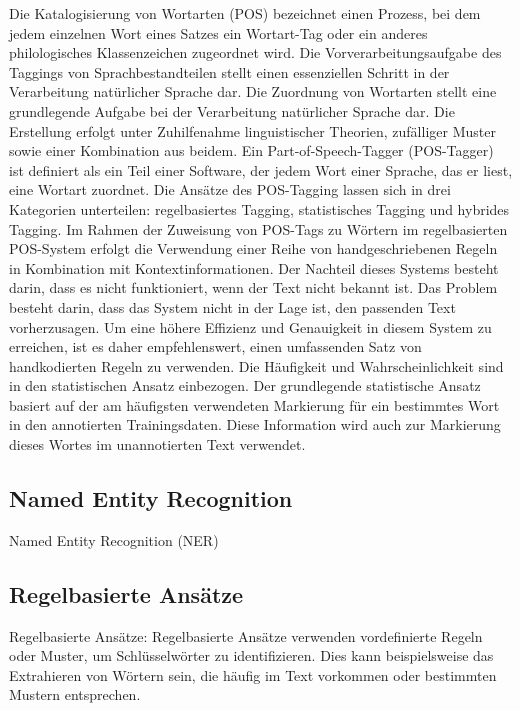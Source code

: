 Die Katalogisierung von Wortarten (POS) bezeichnet einen Prozess, bei dem jedem einzelnen Wort eines Satzes ein Wortart-Tag oder ein anderes philologisches Klassenzeichen zugeordnet wird. Die Vorverarbeitungsaufgabe des Taggings von Sprachbestandteilen stellt einen essenziellen Schritt in der Verarbeitung natürlicher Sprache dar. Die Zuordnung von Wortarten stellt eine grundlegende Aufgabe bei der Verarbeitung natürlicher Sprache dar. Die Erstellung erfolgt unter Zuhilfenahme linguistischer Theorien, zufälliger Muster sowie einer Kombination aus beidem. Ein Part-of-Speech-Tagger (POS-Tagger) ist definiert als ein Teil einer Software, der jedem Wort einer Sprache, das er liest, eine Wortart zuordnet. Die Ansätze des POS-Tagging lassen sich in drei Kategorien unterteilen: regelbasiertes Tagging, statistisches Tagging und hybrides Tagging. Im Rahmen der Zuweisung von POS-Tags zu Wörtern im regelbasierten POS-System erfolgt die Verwendung einer Reihe von handgeschriebenen Regeln in Kombination mit Kontextinformationen. Der Nachteil dieses Systems besteht darin, dass es nicht funktioniert, wenn der Text nicht bekannt ist. Das Problem besteht darin, dass das System nicht in der Lage ist, den passenden Text vorherzusagen. Um eine höhere Effizienz und Genauigkeit in diesem System zu erreichen, ist es daher empfehlenswert, einen umfassenden Satz von handkodierten Regeln zu verwenden. Die Häufigkeit und Wahrscheinlichkeit sind in den statistischen Ansatz einbezogen. Der grundlegende statistische Ansatz basiert auf der am häufigsten verwendeten Markierung für ein bestimmtes Wort in den annotierten Trainingsdaten. Diese Information wird auch zur Markierung dieses Wortes im unannotierten Text verwendet.\cite{kumawat2015pos}

\subsection{Named Entity Recognition}
Named Entity Recognition (NER) \cite{mansouri2008named} \cite{nadeau2007survey}\cite{partalidou2019design}\\

\subsection{Regelbasierte Ansätze}
Regelbasierte Ansätze: Regelbasierte Ansätze verwenden vordefinierte Regeln oder Muster, um Schlüsselwörter zu identifizieren. Dies kann beispielsweise das Extrahieren von Wörtern sein, die häufig im Text vorkommen oder bestimmten Mustern entsprechen.\\


